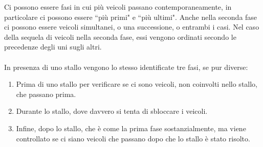 Ci possono essere fasi in cui più veicoli passano contemporaneamente, in particolare ci possono essere ``più primi" e ``più ultimi". Anche nella seconda fase ci possono essere veicoli simultanei, o una successione, o entrambi i casi. Nel caso della sequela di veicoli nella seconda fase, essi vengono ordinati secondo le precedenze degli uni sugli altri.
\\\\
In presenza di uno stallo vengono lo stesso identificate tre fasi, se pur diverse:
\begin{enumerate}
	\item Prima di uno stallo per verificare se ci sono veicoli, non coinvolti nello stallo, che passano prima.
	\item Durante lo stallo, dove davvero si tenta di sbloccare i veicoli.
	\item Infine, dopo lo stallo, che è come la prima fase sostanzialmente, ma viene controllato se ci siano veicoli che passano dopo che lo stallo è stato risolto.
\end{enumerate}

